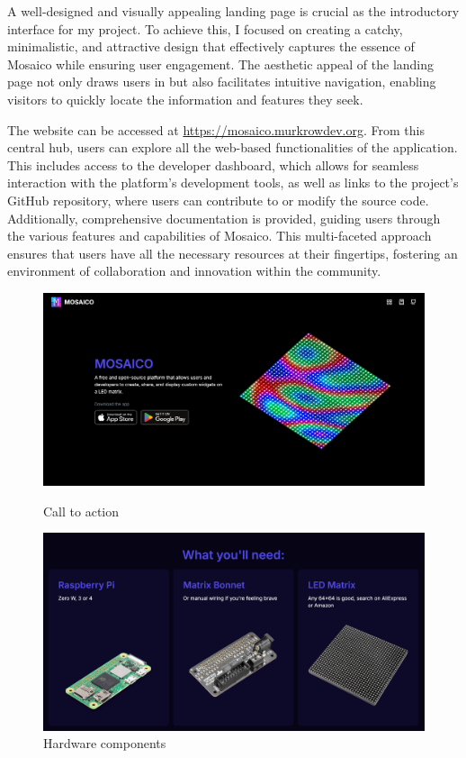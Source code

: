 A well-designed and visually appealing landing page is crucial as the introductory interface for my project. To achieve this, I focused on creating a catchy, minimalistic, and attractive design that effectively captures the essence of Mosaico while ensuring user engagement. The aesthetic appeal of the landing page not only draws users in but also facilitates intuitive navigation, enabling visitors to quickly locate the information and features they seek.

The website can be accessed at \url{https://mosaico.murkrowdev.org}. From this central hub, users can explore all the web-based functionalities of the application. This includes access to the developer dashboard, which allows for seamless interaction with the platform's development tools, as well as links to the project's GitHub repository, where users can contribute to or modify the source code. Additionally, comprehensive documentation is provided, guiding users through the various features and capabilities of Mosaico. This multi-faceted approach ensures that users have all the necessary resources at their fingertips, fostering an environment of collaboration and innovation within the community.

\begin{figure}[H]
\centering
\begin{minipage}[b]{0.49\textwidth}
\centering
\includegraphics[width=\textwidth]{tesi/img/website_demo/landing/1.png}
\caption*{Call to action}
\end{minipage}
\begin{minipage}[b]{0.49\textwidth}
\centering
\includegraphics[width=\textwidth]{tesi/img/website_demo/landing/2.png}
\caption*{Hardware components}
\end{minipage}
\end{figure}

